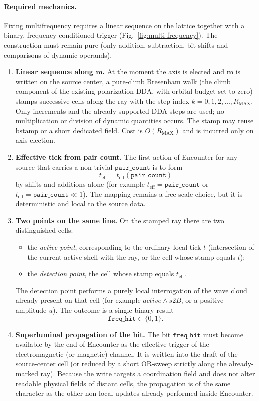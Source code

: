 \documentclass[a4paper]{article}
\begin{document}
\paragraph{Required mechanics.}
Fixing multifrequency requires a linear sequence on the lattice together with a binary, frequency-conditioned trigger (Fig.~\ref{fig:multi-frequency}). The construction must remain pure (only addition, subtraction, bit shifts and comparisons of dynamic operands).

\begin{enumerate}
\item \textbf{Linear sequence along $\boldsymbol{m}$.}
  At the moment the axis is elected and $\boldsymbol{m}$ is written on the source center, a pure-climb Bresenham walk (the climb component of the existing polarization DDA, with orbital budget set to zero) stamps successive cells along the ray with the step index $k=0,1,2,\dots,R_{\mathrm{MAX}}$. Only increments and the already-supported DDA steps are used; no multiplication or division of dynamic quantities occurs. The stamp may reuse $\mathrm{bstamp}$ or a short dedicated field. Cost is $O(R_{\mathrm{MAX}})$ and is incurred only on axis election.

\item \textbf{Effective tick from pair count.}
  The first action of Encounter for any source that carries a non-trivial $\texttt{pair\_count}$ is to form
  \[
  t_{\mathrm{eff}}=t_{\mathrm{eff}}(\texttt{pair\_count})
  \]
  by shifts and additions alone (for example $t_{\mathrm{eff}}=\texttt{pair\_count}$ or $t_{\mathrm{eff}}=\texttt{pair\_count}\ll 1$). The mapping remains a free scale choice, but it is deterministic and local to the source data.

\item \textbf{Two points on the same line.}
  On the stamped ray there are two distinguished cells:
  \begin{itemize}
  \item the \emph{active point}, corresponding to the ordinary local tick $t$ (intersection of the current active shell with the ray, or the cell whose stamp equals $t$);
  \item the \emph{detection point}, the cell whose stamp equals $t_{\mathrm{eff}}$.
  \end{itemize}
  The detection point performs a purely local interrogation of the wave cloud already present on that cell (for example $\mathit{active}\land s2B$, or a positive amplitude $u$). The outcome is a single binary result
  \[
  \texttt{freq\_hit}\in\{0,1\}.
  \]

\item \textbf{Superluminal propagation of the bit.}
  The bit $\texttt{freq\_hit}$ must become available by the end of Encounter as the effective trigger of the electromagnetic (or magnetic) channel. It is written into the draft of the source-center cell (or reduced by a short OR-sweep strictly along the already-marked ray). Because the write targets a coordination field and does not alter readable physical fields of distant cells, the propagation is of the same character as the other non-local updates already performed inside Encounter.
\end{enumerate}
\end{document}
